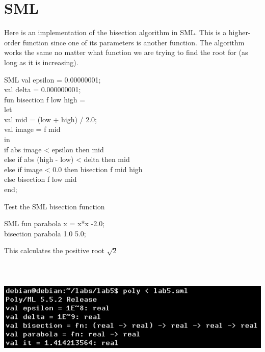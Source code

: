 \documentclass{article}
\begin{document}
\clearpage
\begin{figure}

\end{figure}
\begin{figure}

\end{figure}
\clearpage
\section{SML}
Here is an implementation of the bisection algorithm in SML.
This is a higher-order function since one of its parameters is another function.
The algorithm works the same no matter what function we are trying to find the root for (as long as it is increasing).
\begin{GFT}{SML}
\+val epsilon = 0.00000001;\\
\+val delta = 0.000000001;\\
\+fun bisection f low high =\\
\+	let\\
\+		val mid = (low + high) / 2.0;\\
\+		val image = f mid \\
\+	in \\
\+		if abs image < epsilon then mid\\
\+		else if abs (high - low) < delta then mid\\
\+		else if image < 0.0 then bisection f mid high\\
\+				    else bisection f low mid  	\\
\+	end;\\
\end{GFT}
\clearpage
Test the SML bisection function
\begin{GFT}{SML}
\+fun parabola x = x*x -2.0;\\
\+bisection parabola \Twiddles{}1.0 5.0;\\
\end{GFT}
This calculates the positive root $\sqrt{2}$ \\ \\ \\ \\ 
\includegraphics[scale=0.8]{lab5sml.png}
\clearpage
\end{document}
